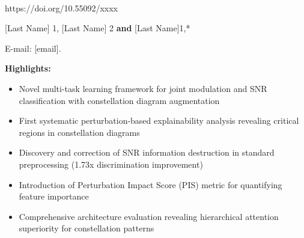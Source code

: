 \documentclass{ELSP}
\begin{document}
\thispagestyle{firstpage}

\let\thefootnote\relax
{}

\begin{flushleft}
{\sffamily \small {}}\\
{\sffamily\small{https://doi.org/10.55092/xxxx}}


\authorname{[Author 1]} {[Last Name]} {1},
\authorname{[Author 2]} {[Last Name]} {2}
\textbf{and} 
 {[Last Name]}{1,}{*}


 {E-mail: [email].}
\end{flushleft}

\noindent\textbf{\textcolor[RGB]{0,131,255}{Highlights:}}\\
\newline
\begin{itemize}
    \item Novel multi-task learning framework for joint modulation and SNR classification with constellation diagram augmentation
    \item First systematic perturbation-based explainability analysis revealing critical regions in constellation diagrams
    \item Discovery and correction of SNR information destruction in standard preprocessing (1.73x discrimination improvement)
    \item Introduction of Perturbation Impact Score (PIS) metric for quantifying feature importance
    \item Comprehensive architecture evaluation revealing hierarchical attention superiority for constellation patterns
\end{itemize}
\end{document}
